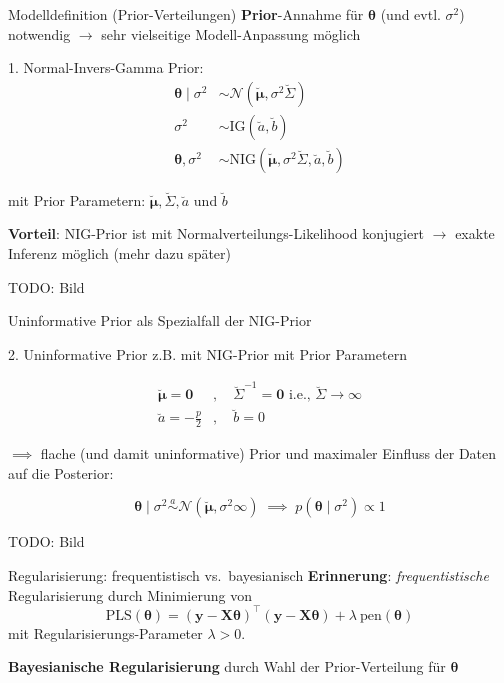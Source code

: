 \documentclass[
  ignorenonframetext,
  aspectratio=169,
]{beamer}
\newcommand{\bnull}{\bm{0}}
\newcommand{\by}{\bm{y}}
\newcommand{\bX}{\bm{X}}
\newcommand{\Ncal}{\mathcal{N}}
\newcommand{\ssd}{\sigma^2}
\newcommand{\btheta}{\bm{\theta}}
\newcommand{\mupri}{\breve{\bm{\mu}}}
\newcommand{\Sdpri}{\breve{\Sigma}}
\newcommand{\Sdipri}{\breve{\Sigma}^{-1}}
\newcommand{\apri}{\breve{a}}
\newcommand{\bpri}{\breve{b}}
\newcommand{\IG}{\text{IG}}
\begin{document}
\begin{frame}{Modelldefinition (Prior-Verteilungen)}
\protect{}\label{modelldefinition-prior-verteilungen}
\textbf{Prior}-Annahme für \(\btheta\) (und evtl. \(\ssd\)) notwendig
\(\to\) sehr vielseitige Modell-Anpassung möglich

\begin{block}{1. Normal-Invers-Gamma Prior:}
\protect{}\label{normal-invers-gamma-prior}
\[
\begin{aligned}
  \btheta \mid \ssd &\sim  \Ncal(\mupri, \ssd \Sdpri) \\
  \ssd &\sim \IG(\apri, \bpri) \\
  \btheta, \ssd &\sim \text{NIG}(\mupri, \ssd \Sdpri, \apri, \bpri)
\end{aligned}
\]

mit Prior Parametern: \(\mupri, \Sdpri, \apri\) und \(\bpri\)
\end{block}

\textbf{Vorteil}: NIG-Prior ist mit Normalverteilungs-Likelihood
konjugiert \(\to\) exakte Inferenz möglich (mehr dazu später)

TODO: Bild
\end{frame}

\begin{frame}{Uninformative Prior als Spezialfall der NIG-Prior}
\protect{}\label{uninformative-prior-als-spezialfall-der-nig-prior}
\begin{block}{2. Uninformative Prior}
\protect{}\label{uninformative-prior}
z.B. mit NIG-Prior mit Prior Parametern

\[
\begin{aligned}
\mupri = \bnull&, \quad \Sdipri = \bnull \text{  i.e., } \Sdpri \to \infty \\
\apri = - \frac{p}{2}&, \quad \bpri = 0
\end{aligned}
\]

\(\implies\) flache (und damit uninformative) Prior und maximaler
Einfluss der Daten auf die Posterior:

\[
\btheta \mid \ssd \overset{a}{\sim}  \Ncal(\mupri, \ssd \infty) \; \implies \; p(\btheta\mid \ssd) \propto 1
\]
\end{block}

TODO: Bild
\end{frame}

\begin{frame}{Regularisierung: frequentistisch vs.~bayesianisch}
\protect{}\label{regularisierung-frequentistisch-vs.-bayesianisch}
\textbf{Erinnerung}: \emph{frequentistische} Regularisierung durch
Minimierung von
\[\text{PLS}(\btheta) = (\by - \bX \btheta)^\top (\by - \bX \btheta) + \lambda \ \text{pen}(\btheta)\]
mit Regularisierungs-Parameter \(\lambda > 0\).

\textbf{Bayesianische Regularisierung} durch Wahl der Prior-Verteilung
für \(\btheta\)
\end{frame}
\end{document}
